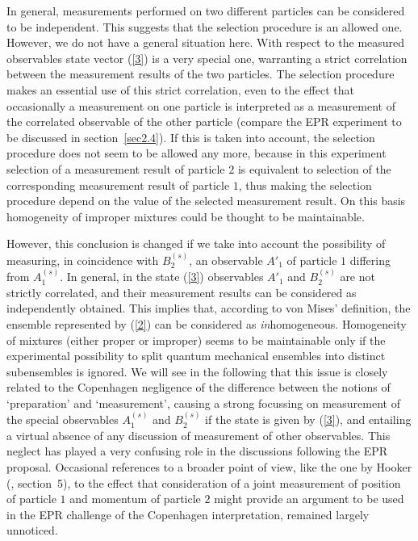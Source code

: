 \documentclass[12pt]{article}
\begin{document}
In general, measurements performed on two different particles can
be considered to be independent. This suggests that the selection
procedure is an allowed one. However, we do not have a general
situation here. With respect to the measured observables state
vector (\ref{3}) is a very special one, warranting a strict
correlation between the measurement results of the two particles.
The selection procedure makes an essential use of this strict
correlation, even to the effect that occasionally a measurement on
one particle is interpreted as a measurement of the correlated
observable of the other particle (compare the EPR experiment to be
discussed in section~\ref{sec2.4}). If this is taken into account,
the selection procedure does not seem to be allowed any more,
because in this experiment selection of a measurement result of
particle $2$ is equivalent to selection of the corresponding
measurement result of particle $1$, thus making the selection
procedure depend on the value of the selected measurement result.
On this basis homogeneity of improper mixtures could be thought to
be maintainable.

However, this conclusion is changed if we take into account the
possibility of measuring, in coincidence with $B^{(s)}_2$, an
observable $A'_1$ of particle $1$ differing from $A^{(s)}_1$. In
general, in the state (\ref{3}) observables $A'_1$ and $B^{(s)}_2$
are not strictly correlated, and their measurement results can be
considered as independently obtained. This implies that, according
to von Mises' definition, the ensemble represented by (\ref{2})
can be considered as {\em in}homogeneous. Homogeneity of mixtures
(either proper or improper) seems to be maintainable only if the
experimental possibility to split quantum mechanical ensembles
into distinct subensembles is ignored. We will see in the
following that this issue is closely related to the Copenhagen
negligence of the difference between the notions of `preparation'
and `measurement', causing a strong focussing on measurement of
the special observables $A^{(s)}_1$ and $B^{(s)}_2$ if the state
is given by (\ref{3}), and entailing a virtual absence of any
discussion of measurement of other observables. This neglect has
played a very confusing role in the discussions following the EPR
proposal. Occasional references to a broader point of view, like
the one by Hooker (\cite{Hooker72}, section~5), to the effect that
consideration of a joint measurement of position of particle $1$
and momentum of particle $2$ might provide an argument to be used
in the EPR challenge of the Copenhagen interpretation, remained
largely unnoticed.
\end{document}
